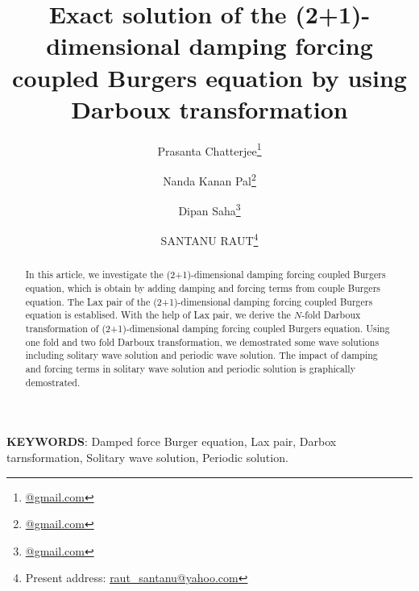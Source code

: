 \documentclass{article}%
\begin{document}
	\title{Exact solution of the (2+1)-dimensional damping forcing  coupled Burgers equation by using   Darboux transformation}
	\author[1] {Prasanta Chatterjee\thanks{\href{mailto:@gmail.com}{@gmail.com}}}
	\author[1] {Nanda Kanan Pal\thanks{\href{mailto:@gmail.com}{@gmail.com}}}
	\author[1] {Dipan Saha\thanks{\href{mailto:@gmail.com}{@gmail.com}}}
	\author[2] {SANTANU RAUT\thanks{Present address: \href{mailto:raut\_santanu@yahoo.com}{raut\_santanu@yahoo.com}}}
	\date{}
	\maketitle
	\begin{abstract}
	In this article, we investigate the (2+1)-dimensional damping forcing coupled Burgers equation, which is obtain by adding damping and forcing terms from couple Burgers equation. The Lax pair of the (2+1)-dimensional damping forcing coupled Burgers equation is establised. With the help of Lax pair, we derive the $N$-fold Darboux transformation of (2+1)-dimensional damping forcing coupled Burgers equation. Using one fold and two fold Darboux transformation, we demostrated some wave solutions including solitary wave solution and periodic wave solution. The impact of damping and forcing terms in solitary wave solution and periodic solution is graphically demostrated. 
	\end{abstract}
	\textbf{KEYWORDS}: {Damped force Burger equation, Lax pair, Darbox tarnsformation, Solitary wave solution, Periodic solution.
	}
\end{document}
